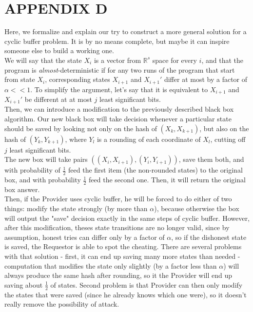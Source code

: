 \documentclass{winnower}
\begin{document}
\section*{APPENDIX D}
Here, we formalize and explain our try to construct a more general solution for a cyclic buffer problem. It is by no means complete, but maybe it can inspire someone else to build a working one.\\
We will say that the state $X_{i}$ is a vector from $\mathbb{R}^s$ space for every $i$, and that the program is \textit{almost}-deterministic if for any two runs of the program that start from state $X_{i}$, corresponding states $X_{i+1}$ and $X_{i+1}'$ differ at most by a factor of $\alpha << 1$. To simplify the argument, let's say that it is equivalent to $X_{i+1}$ and $X_{i+1}'$ be different at at most $j$ least significant bits.\\
Then, we can introduce a modification to the previously described black box algorithm. Our new black box will take decision whenever a particular state should be saved by looking not only on the hash of $(X_{k}, X_{k+1})$, but also on the hash of $(Y_{k}, Y_{k+1})$, where $Y_l$ is a rounding of each coordinate of $X_l$, cutting off $j$ least significant bits.\\
The new box will  take pairs $((X_{i}, X_{i+1}), (Y_{i}, Y_{i+1}))$, save them both, and with probability of $\frac{1}{2}$ feed the first item (the non-rounded states) to the original box, and with probability $\frac{1}{2}$ feed the second one. Then, it will return the original box answer.\\ 
Then, if the Provider uses cyclic buffer, he will be forced to do either of two things: modify the state strongly (by more than $\alpha$), because otherwise the box will output the "save" decision exactly in the same steps of cyclic buffer. However, after this modification, theses state transitions are no longer valid, since by assumption, honest tries can differ only by a factor of $\alpha$, so if the dishonest state is saved, the Requestor is able to spot the cheating.
There are several problems with that solution - first, it can end up saving many more states than needed - computation that modifies the state only slightly (by a factor less than $\alpha$) will always produce the same hash after rounding, so it the Provider will end up saving about $\frac{1}{2}$ of states.
Second problem is that Provider can then only modify the states that were saved (since he already knows which one were), so it doesn't really remove the possibility of attack.
\end{document}
